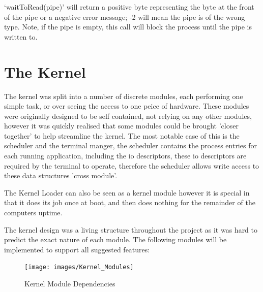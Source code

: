 \documentclass[a4paper]{report}
\begin{document}
`waitToRead(pipe)' will return a positive byte representing the byte at the front of the pipe or a negative error message; -2 will mean the pipe is of the wrong type. Note, if the pipe is empty, this call will block the process until the pipe is written to.





















\clearpage
\section{The Kernel}

The kernel was split into a number of discrete modules, each performing one simple task, or over seeing the access to one peice of hardware. These modules were originally designed to be self contained, not relying on any other modules, however it was quickly realised that some modules could be brought 'closer together' to help streamline the kernel. The most notable case of this is the scheduler and the terminal manger, the scheduler contains the process entries for each running application, including the io descriptors, these io descriptors are required by the terminal to operate, therefore the scheduler allows write access to these data structures 'cross module'.

The Kernel Loader can also be seen as a kernel module however it is special in that it does its job once at boot, and then does nothing for the remainder of the computers uptime.


The kernel design was a living structure throughout the project as it was hard to predict the exact nature of each module. The following modules will be implemented to support all suggested features:

\begin{figure}[ht]
\centering
\texttt{[image: images/Kernel\_Modules]}
\caption{Kernel Module Dependencies}
\label{fig:WinTitleBarScreen}
\end{figure}

\end{document}
